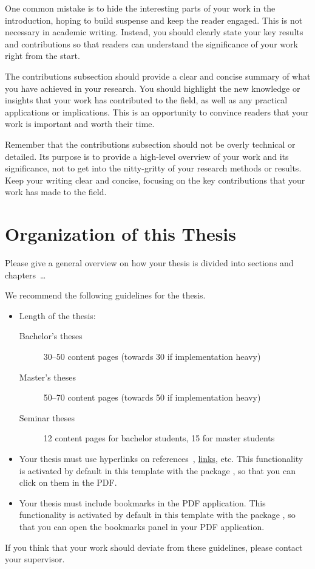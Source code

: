 One common mistake is to hide the interesting parts of your work in the introduction, hoping to build suspense and keep the reader engaged. This is not necessary in academic writing. Instead, you should clearly state your key results and contributions so that readers can understand the significance of your work right from the start.

The contributions subsection should provide a clear and concise summary of what you have achieved in your research. You should highlight the new knowledge or insights that your work has contributed to the field, as well as any practical applications or implications. This is an opportunity to convince readers that your work is important and worth their time.

Remember that the contributions subsection should not be overly technical or detailed. Its purpose is to provide a high-level overview of your work and its significance, not to get into the nitty-gritty of your research methods or results. Keep your writing clear and concise, focusing on the key contributions that your work has made to the field.

\section{Organization of this Thesis}
Please give a general overview on how your thesis is divided into sections and chapters~\dots

We recommend the following guidelines for the thesis.

\begin{itemize}
    \item Length of the thesis:
    \begin{description}
        \item[Bachelor's theses] 30--50 content pages (towards 30 if implementation heavy)
        \item[Master's theses] 50--70 content pages (towards 50 if implementation heavy)
        \item[Seminar theses] 12 content pages for bachelor students, 15 for master students
    \end{description}
    \item Your thesis must use hyperlinks on references~\cite{AviramSSHDSVAHD16}, \href{https://example.com}{links}, etc. This functionality is activated by default in this template with the package , so that you can click on them in the PDF.
    \item Your thesis must include bookmarks in the PDF application. This functionality is activated by default in this template with the package , so that you can open the bookmarks panel in your PDF application.
\end{itemize}

If you think that your work should deviate from these guidelines, please contact your supervisor.